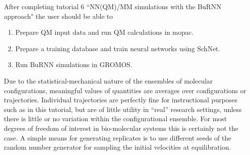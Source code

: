 %
After completing tutorial 6 “NN(QM)/MM simulations with the
BuRNN approach" the user should be able to
\begin{enumerate}
\item Prepare QM input data and run QM calculations in mopac.
\item Prepare a training database and train neural networks using SchNet.
\item Run BuRNN simulations in GROMOS.
\end{enumerate}
%
Due to the statistical-mechanical nature of the ensembles of molecular configurations, meaningful values of quantities are averages over configurations or trajectories. Individual trajectories are perfectly fine for instructional purposes such as in this tutorial, but are of little utility in ``real'' research settings, unless there is little or no variation within the configurational ensemble. 
For most degrees of freedom of interest in bio-molecular systems this is certainly not the case. A simple means for generating replicates is to use different seeds of the random number generator for sampling the initial velocities at equilibration.



